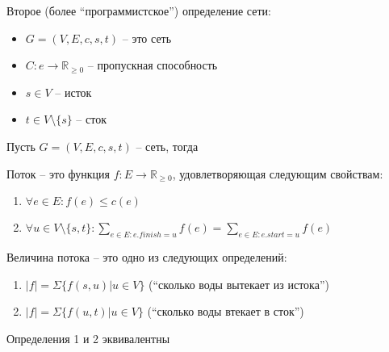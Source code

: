 \begin{definition}
    Второе (более ``программистское'') определение сети:
    \begin{itemize}
        \item $G = (V, E, c, s, t)$ -- это сеть
        \item $C: e \rightarrow \mathbb{R}_{\geq 0}$ -- пропускная способность
        \item $s \in V$ -- исток
        \item $t \in V \setminus \{s\}$ -- сток
    \end{itemize}
\end{definition}

\noindent Пусть $G = (V, E, c, s, t)$ -- сеть, тогда
\begin{definition}
    Поток -- это функция $f: E \rightarrow \mathbb{R}_{\geq 0}$, удовлетворяющая следующим свойствам:
    \begin{enumerate}
        \item $\forall e \in E: f(e) \leq c(e)$
        \item $\forall u \in V \setminus \{s, t\}: \sum_{e \in E: e.finish = u} f(e) = \sum_{e \in E: e.start = u} f(e)$
    \end{enumerate}
\end{definition}

\begin{definition}
    Величина потока -- это одно из следующих определений:
    \begin{enumerate}
        \item $|f| = \Sigma \{f(s, u) | u \in V\}$ (``сколько воды вытекает из истока'')
        \item $|f| = \Sigma \{f(u, t) | u \in V\}$ (``сколько воды втекает в сток'')
    \end{enumerate}
\end{definition}


\begin{lemma}
    Определения 1 и 2 эквивалентны
\end{lemma}

